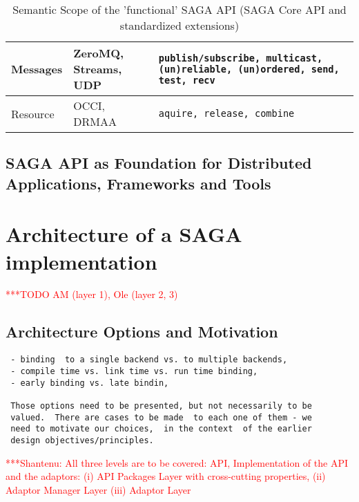 \documentclass[a4paper,12pt]{article}
\newcommand{\todo}[1]{     {\textcolor{red}  { ***TODO      #1 }}}
\newcommand{\jhanote}[1]{  {\textcolor{red}  { ***Shantenu: #1 }}}
\newcommand{\todo}[1]{}
\newcommand{\jhanote}[1]{}
\newcommand{\T}[1]{\texttt{#1}}
\begin{document}
\begin{table}[h!]
\begin{footnotesize}
\begin{center}
\begin{tabular}{@{}p{2.80cm} p{3.50cm} p{9.50cm}@{}}
        \\
      \midrule
        Messages
        & ZeroMQ, Streams, UDP
        & \T{publish/subscribe, multicast,
        (un)reliable, (un)ordered, send, test, recv}
        \\
      \midrule
        Resource
        & OCCI, DRMAA
        & \T{aquire, release, combine}
        \\
      \bottomrule
     \end{tabular}
     \caption{Semantic Scope of the 'functional' SAGA API (SAGA Core
     API and standardized extensions)}
    \label{tab:apiscope}
   \end{center}
   \end{footnotesize}
  \end{table}



 \subsection{SAGA API as Foundation for Distributed Applications,
 Frameworks and Tools}

% 
\section{Architecture of a SAGA implementation} \todo{AM (layer 1), Ole (layer 2, 3)}
\label{sec:architecture}

\subsection{Architecture Options and Motivation}

\begin{verbatim}
 - binding  to a single backend vs. to multiple backends,
 - compile time vs. link time vs. run time binding,
 - early binding vs. late bindin,
 
 Those options need to be presented, but not necessarily to be 
 valued.  There are cases to be made  to each one of them - we 
 need to motivate our choices,  in the context  of the earlier 
 design objectives/principles.
\end{verbatim}

\jhanote{All three levels are to be covered: API, Implementation of
  the API and the adaptors: (i) API Packages Layer with cross-cutting
  properties, (ii) Adaptor Manager Layer (iii) Adaptor Layer}

\end{document}
